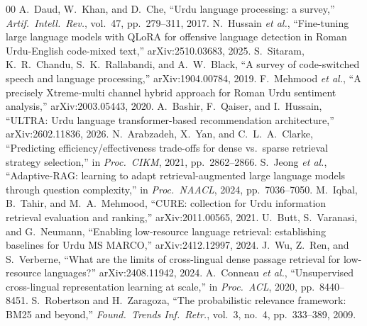 \documentclass[conference]{IEEEtran}
\begin{document}
\begin{thebibliography}{00}
 A.\ Daud, W.\ Khan, and D.\ Che, ``Urdu language processing: a survey,'' \emph{Artif.\ Intell.\ Rev.}, vol.\ 47, pp.\ 279--311, 2017.
 N.\ Hussain \emph{et al.}, ``Fine-tuning large language models with QLoRA for offensive language detection in Roman Urdu-English code-mixed text,'' arXiv:2510.03683, 2025.
 S.\ Sitaram, K.\ R.\ Chandu, S.\ K.\ Rallabandi, and A.\ W.\ Black, ``A survey of code-switched speech and language processing,'' arXiv:1904.00784, 2019.
 F.\ Mehmood \emph{et al.}, ``A precisely Xtreme-multi channel hybrid approach for Roman Urdu sentiment analysis,'' arXiv:2003.05443, 2020.
 A.\ Bashir, F.\ Qaiser, and I.\ Hussain, ``ULTRA: Urdu language transformer-based recommendation architecture,'' arXiv:2602.11836, 2026.
 N.\ Arabzadeh, X.\ Yan, and C.\ L.\ A.\ Clarke, ``Predicting efficiency/effectiveness trade-offs for dense vs.\ sparse retrieval strategy selection,'' in \emph{Proc.\ CIKM}, 2021, pp.\ 2862--2866.
 S.\ Jeong \emph{et al.}, ``Adaptive-RAG: learning to adapt retrieval-augmented large language models through question complexity,'' in \emph{Proc.\ NAACL}, 2024, pp.\ 7036--7050.
 M.\ Iqbal, B.\ Tahir, and M.\ A.\ Mehmood, ``CURE: collection for Urdu information retrieval evaluation and ranking,'' arXiv:2011.00565, 2021.
 U.\ Butt, S.\ Varanasi, and G.\ Neumann, ``Enabling low-resource language retrieval: establishing baselines for Urdu MS MARCO,'' arXiv:2412.12997, 2024.
 J.\ Wu, Z.\ Ren, and S.\ Verberne, ``What are the limits of cross-lingual dense passage retrieval for low-resource languages?'' arXiv:2408.11942, 2024.
 A.\ Conneau \emph{et al.}, ``Unsupervised cross-lingual representation learning at scale,'' in \emph{Proc.\ ACL}, 2020, pp.\ 8440--8451.
 S.\ Robertson and H.\ Zaragoza, ``The probabilistic relevance framework: BM25 and beyond,'' \emph{Found.\ Trends Inf.\ Retr.}, vol.\ 3, no.\ 4, pp.\ 333--389, 2009.
\end{thebibliography}
\end{document}
